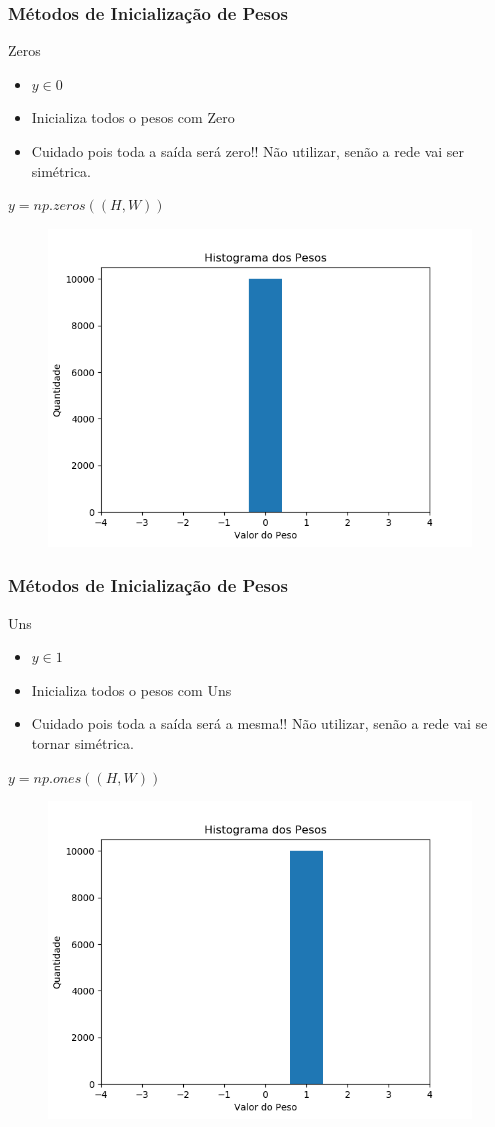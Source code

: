 \documentclass{beamer}
\begin{document}
\begin{frame}
	\frametitle{Métodos de Inicialização de Pesos}
	\begin{block}{Zeros}
		\begin{itemize}
			\item $y \in 0$ 
			\item Inicializa todos o pesos com Zero
			\item Cuidado pois toda a saída será zero!! Não utilizar, senão a rede vai ser simétrica.
		\end{itemize}
			$y = np.zeros((H, W))$
		\begin{figure}
			\centering
			\includegraphics[width=0.5\linewidth]{figures/pesos_zeros}
		\end{figure}
	\end{block}
\end{frame}
\begin{frame}
	\frametitle{Métodos de Inicialização de Pesos}
	\begin{block}{Uns}
		\begin{itemize}
			\item $y \in 1$ 
			\item Inicializa todos o pesos com Uns
			\item Cuidado pois toda a saída será a mesma!! Não utilizar, senão a rede vai se tornar simétrica.
		\end{itemize}
		$	y = np.ones((H, W))$
		\begin{figure}
			\centering
			\includegraphics[width=0.5\linewidth]{figures/pesos_ones.png}
		\end{figure}
	\end{block}
\end{frame}
\end{document}
